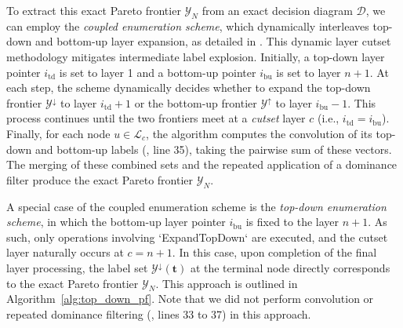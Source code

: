 \documentclass[letterpaper]{article}
\begin{document}
To extract this exact Pareto frontier $\mathcal{Y}_N$ from an exact decision diagram $\mathcal{D}$, we can employ the \emph{coupled enumeration scheme}, which dynamically interleaves top-down and bottom-up layer expansion, as detailed in . This dynamic layer cutset methodology mitigates intermediate label explosion. Initially, a top-down layer pointer $i_{\text{td}}$ is set to layer 1 and a bottom-up pointer $i_{\text{bu}}$ is set to layer $n+1$. At each step, the scheme dynamically decides whether to expand the top-down frontier $\mathcal{Y}^{\downarrow}$ to layer $i_{\text{td}}+1$ or the bottom-up frontier $\mathcal{Y}^{\uparrow}$ to layer $i_{\text{bu}}-1$. This process continues until the two frontiers meet at a \emph{cutset} layer $c$ (i.e., $i_{\text{td}} = i_{\text{bu}}$). Finally, for each node $u \in \mathcal{L}_c$, the algorithm computes the convolution of its top-down and bottom-up labels (, line 35), taking the pairwise sum of these vectors. The merging of these combined sets and the repeated application of a dominance filter produce the exact Pareto frontier $\mathcal{Y}_N$.

A special case of the coupled enumeration scheme is the \emph{top-down enumeration scheme}, in which the bottom-up layer pointer $i_{\text{bu}}$ is fixed to the layer $n+1$. As such, only operations involving `ExpandTopDown` are executed, and the cutset layer naturally occurs at $c = n+1$. In this case, upon completion of the final layer processing, the label set $\mathcal{Y}^{\downarrow}(\mathbf{t})$ at the terminal node directly corresponds to the exact Pareto frontier $\mathcal{Y}_N$. This approach is outlined in Algorithm~\ref{alg:top_down_pf}. Note that we did not perform convolution or repeated dominance filtering (, lines 33 to 37) in this approach.
\end{document}
